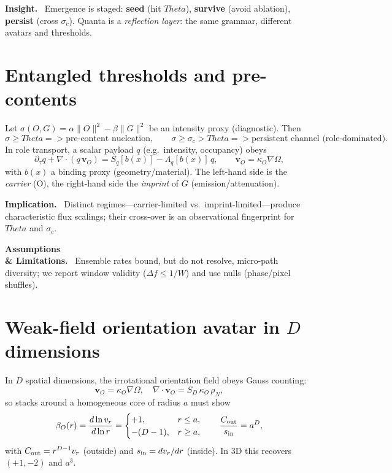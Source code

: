 \documentclass[12pt,a4paper,oneside]{scrreprt}
\def\Theta{Theta}%
\def\Rightarrow{=>}%
\newenvironment{insight}{\par\vspace{0.5em}\noindent\textbf{Insight.}\ }{\par\vspace{0.5em}}
\newenvironment{implication}{\par\vspace{0.5em}\noindent\textbf{Implication.}\ }{\par\vspace{0.5em}}
\newenvironment{limitation}{\par\vspace{0.5em}\noindent\textbf{Assumptions \\ \& Limitations.}\ }{\par\vspace{0.5em}}
\begin{document}
\begin{insight}
Emergence is staged: \textbf{seed} (hit $\Theta$), \textbf{survive} (avoid ablation), \textbf{persist} (cross $\sigma_c$). Quanta is a \emph{reflection layer}: the same grammar, different avatars and thresholds.
\end{insight}

\section{Entangled thresholds and pre-contents}\label{sec:quanta-thresholds}
Let $\sigma(O,G)=\alpha\|O\|^2-\beta\|G\|^2$ be an intensity proxy (diagnostic). Then
\[
\sigma\ge \Theta \Rightarrow \text{pre-content nucleation},\qquad
\sigma\ge \sigma_c>\Theta \Rightarrow \text{persistent channel (role-dominated)}.
\]
In role transport, a scalar payload $q$ (e.g.\ intensity, occupancy) obeys
\begin{equation}
\partial_{\tau} q + \nabla\!\cdot(q\,\mathbf v_O)= S_q[b(x)] - \Lambda_q[b(x)]\,q,
\qquad \mathbf v_O=\kappa_O\nabla\Omega, \label{eq:rt-role}
\end{equation}
with $b(x)$ a binding proxy (geometry/material). The left-hand side is the \emph{carrier} (O), the right-hand side the \emph{imprint} of $G$ (emission/attenuation).

\begin{implication}
Distinct regimes—carrier-limited vs.\ imprint-limited—produce characteristic flux scalings; their cross-over is an observational fingerprint for $\Theta$ and $\sigma_c$.
\end{implication}

\begin{limitation}
Ensemble rates bound, but do not resolve, micro-path diversity; we report window validity ($\Delta f\le 1/W$) and use nulls (phase/pixel shuffles).
\end{limitation}

\section{Weak-field orientation avatar in $D$ dimensions}\label{sec:quanta-avatar-D}
In $D$ spatial dimensions, the irrotational orientation field obeys Gauss counting:
\[
\mathbf v_O=\kappa_O\nabla\Omega,\quad
\nabla\!\cdot \mathbf v_O = S_D\,\kappa_O\,\rho_N,
\]
so stacks around a homogeneous core of radius $a$ must show
\begin{equation}
\beta_O(r)=\frac{d\ln v_r}{d\ln r}=
\begin{cases}+1,& r\le a,\\ -(D-1),& r\ge a, \end{cases}\qquad
\frac{C_{\rm out}}{s_{\rm in}}=a^D, \label{eq:quanta-T1D}
\end{equation}
with $C_{\rm out}=r^{D-1}v_r$ (outside) and $s_{\rm in}=dv_r/dr$ (inside). In 3D this recovers $(+1,-2)$ and $a^3$.
\end{document}
